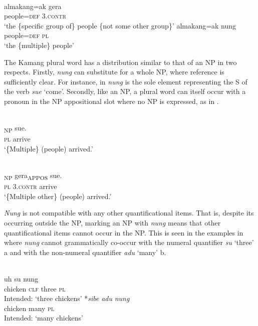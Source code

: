 \ea%
\label{ex:9:36}
 \\
\ea
\gll almakang=ak gera  \\
 people=\textsc{def} \textsc{3.contr}   \\
\glt `the \{specific group of\} people \{not some other group\}'
\ex
\gll almakang=ak nung \\
  people=\textsc{def} \textsc{pl}   \\
\glt  `the \{multiple\} people'
\z
\z






The Kamang plural word has a distribution similar to that of an NP in two respects. Firstly, \textit{nung} can substitute for a whole NP, where reference is sufficiently clear. For instance, in  \textit{nung} is the sole element representing the S of the verb \textit{sue} `come'. Secondly, like an NP, a plural word can itself occur with a pronoun in the NP appositional slot where no NP is expressed, as in .


\ea%
\label{ex:9:37}
 \\
\gll  [Nung]\textsubscript{NP} sue. \\
   \textsc{pl} arrive  \\
\glt `\{Multiple\} (people) arrived.'
\z







\ea%
\label{ex:9:38}
 \\
\gll  [{Nung}]\textsubscript{NP} {gera}\textsubscript{APPOS} sue. \\
   \textsc{pl} \textsc{3.contr} arrive  \\
\glt `\{Multiple other\} (people) arrived.'
\z






\textit{Nung} is not compatible with any other quantificational items. That is, despite its occurring outside the NP, marking an NP with \textit{nung} means that other quantificational items cannot occur in the NP. This is seen in the examples in  where \textit{nung} cannot grammatically co-occur with the numeral quantifier \textit{su} `three' a and with the non-numeral quantifier \textit{adu} `many' b.


\ea%
\label{ex:9:39}
 \\
\ea
{} uh su {nung}\\
   chicken \textsc{clf} three \textsc{pl} \\
\glt Intended: `three chickens'
\ex
\gll
*\textit{sibe} \textit{adu} \textit{nung}\\
    chicken many   \textsc{pl}\\
\glt  Intended: `many chickens'
 \z
 \z




